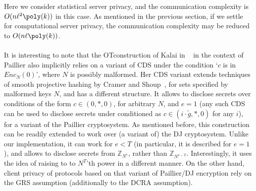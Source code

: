 \documentclass[11pt]{article}
\newcommand{\Z}{{\mathbb{Z}}}
\newcommand{\ot}{\mbox{OT}\;}
\begin{document}
Here we consider statistical server privacy, and the communication complexity
is $O(n\ell^2\poly(k))$ in this case. As mentioned in the previous section, if we settle for computational server privacy, the communication complexity may be reduced to $O(n\ell \poly(k))$.

\paragraph{} It is interesting to note that the \ot construction of Kalai in ~\cite{T05} in the context
of Paillier also implicitly relies on a variant of CDS under the condition `$c$ is in $Enc_N(0)$', where $N$ is possibly malformed.
Her CDS variant extends techniques of smooth projective hashing by Cramer and Shoup~\cite{addref},
for sets specified by malformed keys $N$, and has a different structure.
It allows to disclose secrets over conditions of the form $c\in(0,*,0)$, for arbitrary $N$, and $e=1$
(any such CDS can be used to disclose secrets under conditioned as $c\in(i\cdot \tilde{g},*,0)$ for any $i$), for a variant of the Paillier cryptosystem. As mentioned before, this construction can be
readily extended to work over (a variant of) the DJ cryptosystem. Unlike our implementation, it can work
for $e<T$ (in particular, it is described for $e=1$), and allows to disclose secrets from $\Z_{N^e}$,
rather than $\Z_{N^{e-T}}$. Interestingly, it uses the idea of raising to to $N^T$'th power in a different manner. On the other hand, client privacy of protocols based on that variant of Paillier/DJ encryption
rely on the GRS assumption (additionally to the DCRA assumption).
  
\end{document}
